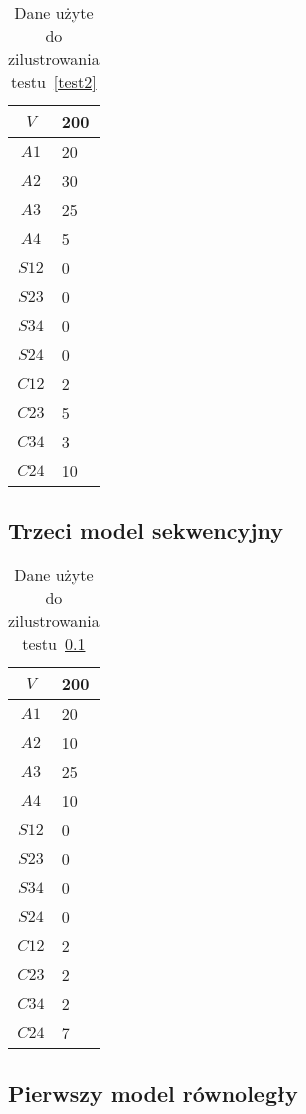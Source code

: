 \begin{table}[H]
\centering
\begin{tabular}{|c|l|}
\hline
$V$ & 200 \\ \hline
$A1$ & 20 \\ \hline
$A2$ & 30 \\ \hline
$A3$ & 25 \\ \hline
$A4$ & 5 \\ \hline
$S12$ & 0 \\ \hline
$S23$ & 0 \\ \hline
$S34$ & 0 \\ \hline
$S24$ & 0 \\ \hline
$C12$ & 2 \\ \hline
$C23$ & 5 \\ \hline
$C34$ & 3 \\ \hline
$C24$ & 10 \\ \hline
\end{tabular}
\caption{Dane użyte do zilustrowania testu~\ref{test2}}
\label{tab:res_2}
\end{table}

\subsection{Trzeci model sekwencyjny} \label{test3}

\begin{table}[H]
\centering
\begin{tabular}{|c|l|}
\hline
$V$ & 200 \\ \hline
$A1$ & 20 \\ \hline
$A2$ & 10 \\ \hline
$A3$ & 25 \\ \hline
$A4$ & 10 \\ \hline
$S12$ & 0 \\ \hline
$S23$ & 0 \\ \hline
$S34$ & 0 \\ \hline
$S24$ & 0 \\ \hline
$C12$ & 2 \\ \hline
$C23$ & 2 \\ \hline
$C34$ & 2 \\ \hline
$C24$ & 7 \\ \hline
\end{tabular}
\caption{Dane użyte do zilustrowania testu~\ref{test3}}
\label{tab:res_3}
\end{table}

\subsection{Pierwszy model równoległy} \label{test4}

